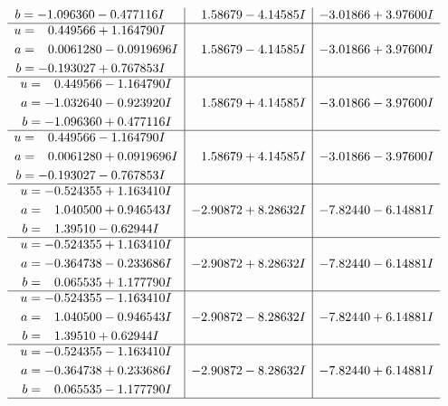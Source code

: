 \documentclass[1p]{elsarticle_modified}
\theoremstyle{definition}
\begin{document}
$$\begin{array}{c|c|c}
\begin{aligned}
b &= -1.096360 - 0.477116 I\end{aligned}
 & \phantom{-}1.58679 - 4.14585 I & -3.01866 + 3.97600 I \\ \hline\begin{aligned}
u &= \phantom{-}0.449566 + 1.164790 I \\
a &= \phantom{-}0.0061280 - 0.0919696 I \\
b &= -0.193027 + 0.767853 I\end{aligned}
 & \phantom{-}1.58679 - 4.14585 I & -3.01866 + 3.97600 I \\ \hline\begin{aligned}
u &= \phantom{-}0.449566 - 1.164790 I \\
a &= -1.032640 - 0.923920 I \\
b &= -1.096360 + 0.477116 I\end{aligned}
 & \phantom{-}1.58679 + 4.14585 I & -3.01866 - 3.97600 I \\ \hline\begin{aligned}
u &= \phantom{-}0.449566 - 1.164790 I \\
a &= \phantom{-}0.0061280 + 0.0919696 I \\
b &= -0.193027 - 0.767853 I\end{aligned}
 & \phantom{-}1.58679 + 4.14585 I & -3.01866 - 3.97600 I \\ \hline\begin{aligned}
u &= -0.524355 + 1.163410 I \\
a &= \phantom{-}1.040500 + 0.946543 I \\
b &= \phantom{-}1.39510 - 0.62944 I\end{aligned}
 & -2.90872 + 8.28632 I & -7.82440 - 6.14881 I \\ \hline\begin{aligned}
u &= -0.524355 + 1.163410 I \\
a &= -0.364738 - 0.233686 I \\
b &= \phantom{-}0.065535 + 1.177790 I\end{aligned}
 & -2.90872 + 8.28632 I & -7.82440 - 6.14881 I \\ \hline\begin{aligned}
u &= -0.524355 - 1.163410 I \\
a &= \phantom{-}1.040500 - 0.946543 I \\
b &= \phantom{-}1.39510 + 0.62944 I\end{aligned}
 & -2.90872 - 8.28632 I & -7.82440 + 6.14881 I \\ \hline\begin{aligned}
u &= -0.524355 - 1.163410 I \\
a &= -0.364738 + 0.233686 I \\
b &= \phantom{-}0.065535 - 1.177790 I\end{aligned}
 & -2.90872 - 8.28632 I & -7.82440 + 6.14881 I\\
 \hline 
 \end{array}$$\newpage\newpage\renewcommand{\arraystretch}{1}
\end{document}
